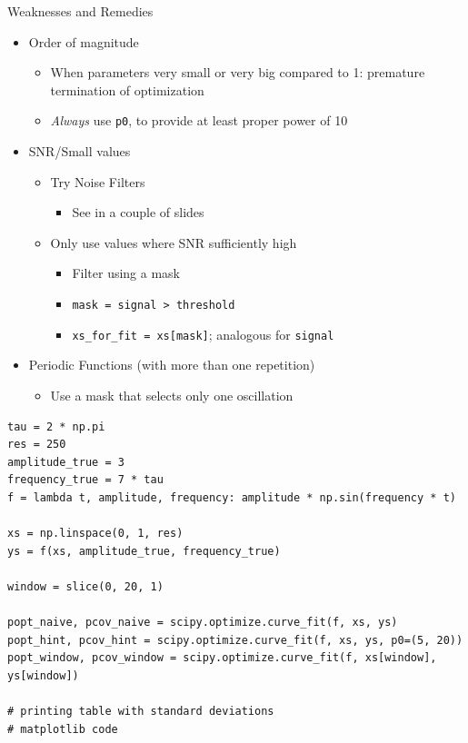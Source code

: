 \begin{frame}{Weaknesses and Remedies}
%
\begin{itemize}
\item Order of magnitude
	\begin{itemize}
	\item When parameters very small or very big compared to 1: premature termination of optimization
	\item[\Thus] \emph{Always} use \texttt{p0}, to provide at least proper power of 10
	\end{itemize}
\item SNR/Small values
	\begin{itemize}
	\item[\Thus] Try Noise Filters
		\begin{itemize}
		\item See in a couple of slides
		\end{itemize}
	\item[\Thus] Only use values where SNR sufficiently high
		\begin{itemize}
		\item Filter using a mask
		\item \texttt{mask = signal > threshold}
		\item \texttt{xs\_for\_fit = xs[mask]}; analogous for \texttt{signal}
		\end{itemize}
	\end{itemize}
\item Periodic Functions (with more than one repetition)
	\begin{itemize}
	\item[\Thus] Use a mask that selects only one oscillation
	\end{itemize}
\end{itemize}
%
\end{frame}


\begin{frame}[fragile]
%
\begin{codebox}
\begin{verbatim}
tau = 2 * np.pi
res = 250
amplitude_true = 3
frequency_true = 7 * tau
f = lambda t, amplitude, frequency: amplitude * np.sin(frequency * t)

xs = np.linspace(0, 1, res)
ys = f(xs, amplitude_true, frequency_true)

window = slice(0, 20, 1)

popt_naive, pcov_naive = scipy.optimize.curve_fit(f, xs, ys)
popt_hint, pcov_hint = scipy.optimize.curve_fit(f, xs, ys, p0=(5, 20))
popt_window, pcov_window = scipy.optimize.curve_fit(f, xs[window], ys[window])

# printing table with standard deviations
# matplotlib code
\end{verbatim}
\end{codebox}
%
\end{frame}

